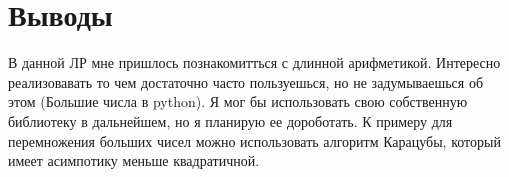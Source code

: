 \section{Выводы}

В данной ЛР мне пришлось познакомитться с длинной арифметикой. Интересно реализовавать то чем достаточно часто пользуешься, но не задумываешься об этом (Большие числа в python). Я мог бы использовать свою собственную библиотеку в дальнейшем, но я планирую ее дороботать. К примеру для перемножения больших чисел можно использовать алгоритм Карацубы, который имеет асимпотику меньше квадратичной.

\pagebreak